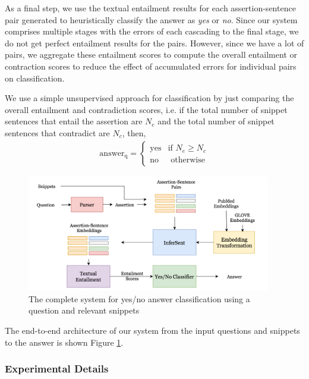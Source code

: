 As a final step, we use the textual entailment results for each assertion-sentence pair generated to heuristically classify the answer as \textit{yes} or \textit{no}. Since our system comprises multiple stages with the errors of each cascading to the final stage, we do not get perfect entailment results for the pairs. However, since we have a lot of pairs, we aggregate these entailment scores to compute the overall entailment or contraction scores to reduce the effect of accumulated errors for individual pairs on classification.

We use a simple unsupervised approach for classification by just comparing the overall entailment and contradiction scores, i.e. if the total number of snippet sentences that entail the assertion are $N_e$ and the total number of snippet sentences that contradict are $N_c$, then, 
\begin{align*}
    \text{answer}_{\text{q}} = \begin{cases}
    \text{yes} & \text{if } N_e \ge N_c \\
    \text{no} & \text{ otherwise}
    \end{cases}
\end{align*}

\begin{figure}[t!]
    \centering
    \includegraphics[width=0.95\textwidth]{images/YesNoPipeline.png}
    \caption{The complete system for yes/no answer classification using a question and relevant snippets}
    \label{fig:yesno_pipeline}
\end{figure}

The end-to-end architecture of our system from the input questions and snippets to the answer is shown Figure \ref{fig:yesno_pipeline}.

\subsubsection{Experimental Details}

